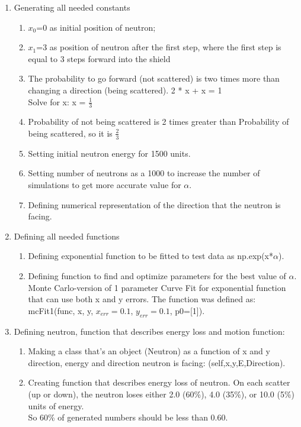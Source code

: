 \documentclass[12pt]{article}
\begin{document}
\begin{enumerate}
\item Generating all needed constants
\begin{enumerate}
    \item $x_0$=0 as initial position of neutron;
    \item $x_1$=3 as position of neutron after the first step, where the first step is equal to 3 steps forward into the shield
    \item The probability to go forward (not scattered) is two times more than changing a direction (being scattered). 2 * x + x = 1 \\
    Solve for x:
    x = $\frac{1}{3}$
    \item Probability of not being scattered is 2 times greater than Probability of being scattered, so it is $\frac{2}{3}$
    \item Setting initial neutron energy for 1500 units.
    \item Setting number of neutrons as a 1000 to increase the number of simulations to get more accurate value for $\alpha$.
    \item Defining numerical representation of the direction that the neutron is facing.
\end{enumerate}
    \item Defining all needed functions
\begin{enumerate}
        \item Defining exponential function to be fitted to test data as 
 np.exp(x*$\alpha$).
        \item Defining function to find and optimize parameters for the best value of $\alpha$. \\
    Monte Carlo-version of 1 parameter Curve Fit for exponential function that can use both x and y errors. The function was defined as:
mcFit1(func, x, y, $x_{err}=0.1$, $y_{err}=0.1$, p0=[1]).
\end{enumerate}
\item Defining neutron, function that describes energy loss and motion function:
\begin{enumerate}
    \item Making a class that's an object (Neutron) as a function of x and y direction, energy and direction neutron is facing: (self,x,y,E,Direction).
    \item Creating function that describes energy loss of neutron.
On each scatter (up or down), the neutron loses either 2.0 (60\%), 4.0 (35\%), or 10.0 (5\%) units of energy.\\
So 60\% of generated numbers should be less than 0.60.\\

\end{enumerate}
\end{enumerate}
\end{document}
